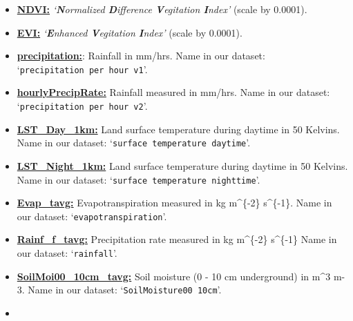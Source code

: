 \documentclass[10pt,parskip=half,
toc=sectionentrywithdots,
bibliography=totocnumbered,
captions=tableheading,numbers=noendperiod]{scrartcl}
\providecommand{\tightlist}{%
  \setlength{\itemsep}{0pt}\setlength{\parskip}{0pt}}
\begin{document}
\begin{itemize}
\tightlist
\item
  \href{https://developers.google.com/earth-engine/datasets/catalog/MODIS_006_MOD13A2}{\textbf{NDVI:}}
  \emph{`\textbf{\emph{N}}ormalized \textbf{\emph{D}}ifference
  \textbf{\emph{V}}egitation \textbf{\emph{I}}ndex'} (scale by
  0.0001).\\
\item
  \href{https://developers.google.com/earth-engine/datasets/catalog/MODIS_006_MOD13A2}{\textbf{EVI:}}
  \emph{`\textbf{\emph{E}}nhanced \textbf{\emph{V}}egitation
  \textbf{\emph{I}}ndex'} (scale by 0.0001).
\item
  \href{https://developers.google.com/earth-engine/datasets/catalog/TRMM_3B43V7\#bands}{\textbf{precipitation:}}:
  Rainfall in mm/hrs. Name in our dataset:
  `\texttt{precipitation\ per\ hour\ v1}'.
\item
  \href{https://developers.google.com/earth-engine/datasets/catalog/JAXA_GPM_L3_GSMaP_v6_operational}{\textbf{hourlyPrecipRate:}}
  Rainfall measured in mm/hrs. Name in our dataset:
  `\texttt{precipitation\ per\ hour\ v2}'.
\item
  \href{https://developers.google.com/earth-engine/datasets/catalog/MODIS_006_MOD11A1}{\textbf{LST\_Day\_1km:}}
  Land surface temperature during daytime in 50 Kelvins. Name in our
  dataset: `\texttt{surface\ temperature\ daytime}'.
\item
  \href{https://developers.google.com/earth-engine/datasets/catalog/MODIS_006_MOD11A1}{\textbf{LST\_Night\_1km:}}
  Land surface temperature during daytime in 50 Kelvins. Name in our
  dataset: `\texttt{surface\ temperature\ nighttime}'.
\item
  \href{https://developers.google.com/earth-engine/datasets/catalog/NASA_FLDAS_NOAH01_C_GL_M_V001}{\textbf{Evap\_tavg:}}
  Evapotranspiration measured in kg m\^{}\{-2\} s\^{}\{-1\}. Name in our
  dataset: `\texttt{evapotranspiration}'.
\item
  \href{https://developers.google.com/earth-engine/datasets/catalog/NASA_FLDAS_NOAH01_C_GL_M_V001}{\textbf{Rainf\_f\_tavg:}}
  Precipitation rate measured in kg m\^{}\{-2\} s\^{}\{-1\} Name in our
  dataset: `\texttt{rainfall}'.
\item
  \href{https://developers.google.com/earth-engine/datasets/catalog/NASA_FLDAS_NOAH01_C_GL_M_V001}{\textbf{SoilMoi00\_10cm\_tavg:}}
  Soil moisture (0 - 10 cm underground) in m\^{}3 m-3. Name in our
  dataset: `\texttt{SoilMoisture00\ 10cm}'.
\item

\end{itemize}
\end{document}
